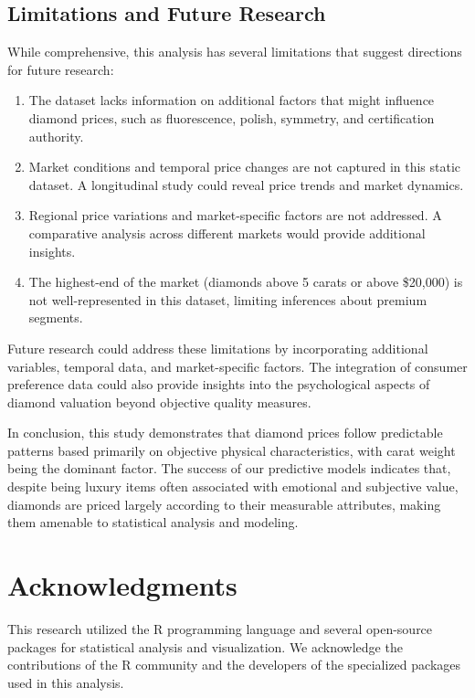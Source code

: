 \documentclass[11pt,a4paper]{article}
\begin{document}
\subsection{Limitations and Future Research}

While comprehensive, this analysis has several limitations that suggest directions for future research:

\begin{enumerate}
    \item The dataset lacks information on additional factors that might influence diamond prices, such as fluorescence, polish, symmetry, and certification authority.
    
    \item Market conditions and temporal price changes are not captured in this static dataset. A longitudinal study could reveal price trends and market dynamics.
    
    \item Regional price variations and market-specific factors are not addressed. A comparative analysis across different markets would provide additional insights.
    
    \item The highest-end of the market (diamonds above 5 carats or above \$20,000) is not well-represented in this dataset, limiting inferences about premium segments.
\end{enumerate}

Future research could address these limitations by incorporating additional variables, temporal data, and market-specific factors. The integration of consumer preference data could also provide insights into the psychological aspects of diamond valuation beyond objective quality measures.

In conclusion, this study demonstrates that diamond prices follow predictable patterns based primarily on objective physical characteristics, with carat weight being the dominant factor. The success of our predictive models indicates that, despite being luxury items often associated with emotional and subjective value, diamonds are priced largely according to their measurable attributes, making them amenable to statistical analysis and modeling.

\section{Acknowledgments}

This research utilized the R programming language and several open-source packages for statistical analysis and visualization. We acknowledge the contributions of the R community and the developers of the specialized packages used in this analysis.
\end{document}
